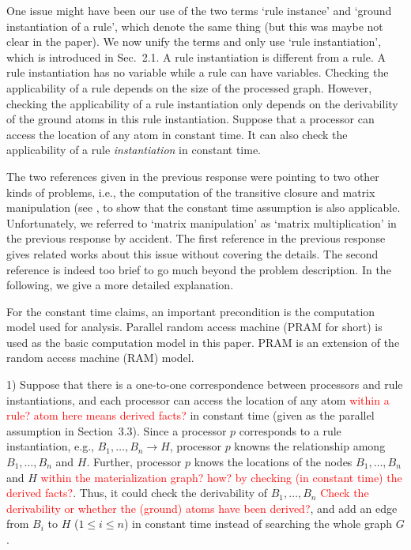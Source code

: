 \documentclass{article}
\begin{document}
One issue might have been our use of the two terms `rule instance'
and `ground instantiation of a rule', which denote the same thing (but
this was maybe not clear in the paper).
We now unify the terms and only use `rule instantiation', which is introduced
in Sec.~2.1. A rule instantiation is different from a rule.
A rule instantiation has no variable while a rule can have variables.
Checking the applicability of a rule depends on the size of the
processed graph. However, checking the applicability of a rule
instantiation only depends on the derivability of the ground atoms
in this rule instantiation. Suppose that a processor can access the
location of any atom in constant time. It can also check the applicability of
a rule \emph{instantiation} in constant time.

The two references given in the previous response were pointing to two
other kinds of problems, i.e., the computation of the transitive
closure and matrix manipulation (see
\cite[Part~\uppercase\expandafter{}~A]{Raymond95}, to
show that the constant time assumption is also
applicable. Unfortunately, we referred to `matrix manipulation' as
`matrix multiplication' in the previous response by accident. The
first reference in the previous response gives related works about
this issue without covering the details. The second reference is
indeed too brief to go much beyond the problem description. In the
following, we give a more detailed explanation.

For the constant time claims, an important precondition is the
computation model used for analysis. Parallel random access machine
(PRAM for short) is used as the basic computation model in this
paper. PRAM is an extension of the random access machine (RAM) model.

1) Suppose that there is a one-to-one correspondence between
processors and rule instantiations, and each processor can access the
location of any atom \textcolor{red}{within a rule? atom here means
  derived facts?} in constant time
(given as the parallel assumption in Section~3.3). Since a processor
$p$ corresponds to a rule instantiation, e.g.,
$B_1, \ldots, B_n \to H$, processor $p$ knowns the relationship among
$B_1, \ldots, B_n$ and $H$. Further, processor $p$ knows the locations
of the nodes $B_1, \ldots, B_n$ and $H$ \textcolor{red}{within the
  materialization graph? how?  by checking (in constant time) the
  derived facts?}. Thus, it could check the
derivability of $B_1, \ldots, B_n$ \textcolor{red}{Check the
  derivability or whether the (ground) atoms have been derived?}, and add an edge from $B_i$ to $H$
($1 \leq i \leq n$) in constant time instead of searching the whole
graph $G$.
\end{document}
